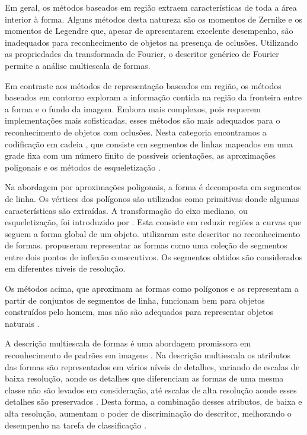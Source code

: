 Em geral, os métodos baseados em região extraem características de toda a área interior à forma. Alguns métodos desta natureza são os momentos de Zernike \cite{Kim:2000} e os momentos de Legendre \cite{Yang:2006} que, apesar de apresentarem excelente desempenho, são inadequados para reconhecimento de objetos na presença de oclusões. Utilizando as propriedades da transformada de Fourier, o descritor genérico de Fourier \cite{Zhang:2002} permite a análise multiescala de formas.

Em contraste aos métodos de representação baseados em região, os métodos baseados em contorno exploram a informação contida na região da fronteira entre a forma e o fundo da imagem. Embora mais complexos, pois requerem implementações mais sofisticadas, esses métodos são mais adequados para o reconhecimento de objetos com oclusões. Nesta categoria encontramos a codificação em cadeia \cite[p~337]{Costa:2009}, que consiste em segmentos de linhas mapeados em uma grade fixa com um número finito de possíveis orientações, as aproximações poligonais \cite[p~340--351]{Costa:2009} e os métodos de esqueletização \cite[p~394--400]{Costa:2009}. 

Na abordagem por aproximações poligonais, a forma é decomposta em segmentos de linha. Os vértices dos polígonos são utilizados como primitivas donde algumas características são extraídas. A transformação do eixo mediano, ou esqueletização, foi introduzido por . Esta consiste em reduzir regiões a curvas que seguem a forma global de um objeto.  utilizaram este descritor no reconhecimento de formas.  propuseram representar as formas como uma coleção de segmentos entre dois pontos de inflexão consecutivos. Os segmentos obtidos são considerados em diferentes níveis de resolução. 

Os métodos acima, que aproximam as formas como polígonos e as representam a partir de conjuntos de segmentos de linha, funcionam bem para objetos construídos pelo homem, mas não são adequados para representar objetos naturais \cite{Zhang:2004}.

A descrição multiescala de formas é uma abordagem promissora em reconhecimento de padrões em imagens \cite{Direkoglu:2011}. Na descrição multiescala os atributos das formas são representados em vários níveis de detalhes, variando de escalas de baixa resolução, aonde os detalhes que diferenciam as formas de uma mesma classe não são levados em consideração, até escalas de alta resolução aonde esses detalhes são preservados \cite{Ullman:1996}. Desta forma, a combinação desses atributos, de baixa e alta resolução, aumentam o poder de discriminação do descritor, melhorando o desempenho na tarefa de classificação \cite{Direkoglu:2011}.

